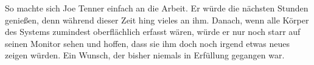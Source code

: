 So machte sich Joe Tenner einfach an die Arbeit. Er würde die nächsten Stunden genießen, denn während dieser Zeit hing vieles an ihm. Danach, wenn alle Körper des Systems zumindest oberflächlich erfasst wären, würde er nur noch starr auf seinen Monitor sehen und hoffen, dass sie ihm doch noch irgend etwas neues zeigen würden. Ein Wunsch, der bisher niemals in Erfüllung gegangen war.
